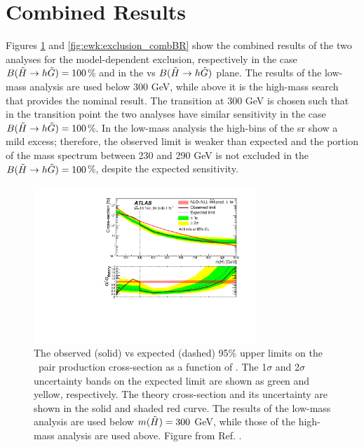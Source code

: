 \section{Combined Results}
\label{sec:ewk:HMLM}

Figures \ref{fig:ewk:exclusion_comb} and \ref{fig:ewk:exclusion_combBR} show the combined results of the two analyses for the model-dependent 
exclusion, respectively in the case $B(\tilde{H}\rightarrow h \tilde{G})=100$\% and in the \mhino vs $B(\tilde{H}\rightarrow h \tilde{G})$ plane.
The results of the low-mass analysis are used below 300 GeV, while above it is the high-mass search that provides the nominal result.
The transition at 300 GeV is chosen such that in the transition point the two analyses have 
similar sensitivity in the case $B(\tilde{H}\rightarrow h \tilde{G})=100$\%.
In the low-mass analysis the high-\met bins of the \gls{sr} show a mild excess; 
therefore, the observed limit is weaker than expected and the portion of the mass spectrum between 230 and 290 GeV is not excluded in the 
$B(\tilde{H}\rightarrow h \tilde{G})=100$\%, despite the expected sensitivity. 

\begin{figure}[htbp]
	\centering
\includegraphics[width=0.75\textwidth]{figures/ewk_prod/interpretation/GGMupperLimit_unblinded_jump}
	\caption{The observed (solid) vs expected (dashed) 95\% upper limits on the \hino\ pair production cross-section as a function of \mhino.  The 1$\sigma$ and 2$\sigma$ uncertainty bands on the expected limit are shown as green and yellow, respectively. The theory cross-section and its uncertainty are shown in the solid and shaded red curve.
   The results of the low-mass analysis are used below $m(\tilde{H}) = 300$ GeV, while those of the high-mass analysis are used above. 
   Figure from Ref. \cite{Aaboud:2018htj}. } 
	\label{fig:ewk:exclusion_comb}
\end{figure}


